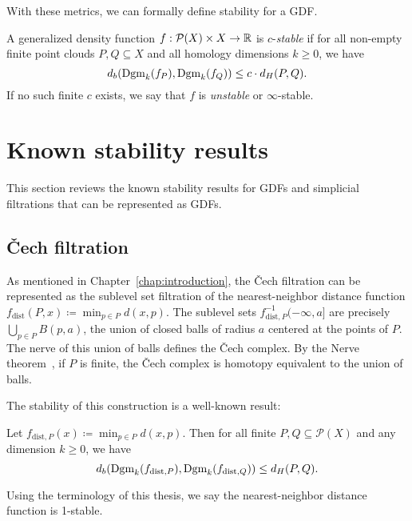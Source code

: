 With these metrics, we can formally define stability for a GDF.
\begin{definition}
    A generalized density function $f : \mathcal{P}(X) \times X \to \mathbb{R}$ is
    $c$-\emph{stable} if for all non-empty finite point clouds $P, Q \subseteq
    X$ and all homology dimensions $k \geq 0$, we have
    \begin{equation}
        d_b(\operatorname{Dgm}_k(f_P), \operatorname{Dgm}_k(f_Q)) \leq c \cdot d_H(P, Q).
    \end{equation}
    If no such finite $c$ exists, we say that $f$ is \emph{unstable} or
    $\infty$-stable.
\end{definition}

\section{Known stability results}

This section reviews the known stability results for GDFs and simplicial
filtrations that can be represented as GDFs.

\subsection{\v{C}ech filtration}
As mentioned in Chapter~\ref{chap:introduction}, the \v{C}ech filtration can be
represented as the sublevel set filtration of the nearest-neighbor distance
function $f_{\mathrm{dist}}(P, x) \coloneqq \min_{p\in P} d(x, p)$.
The sublevel sets $f_{\mathrm{dist}, P}^{-1}(-\infty, a]$ are precisely
$\bigcup_{p\in P} B(p, a)$, the union of closed balls of radius $a$ centered at
the points of $P$. The nerve of this union of balls defines the \v{C}ech
complex. By the Nerve theorem~\cite{Borsuk1948,leray1945forme}, if $P$ is finite,
the \v{C}ech complex is homotopy equivalent to the union of balls.

The stability of this construction is a well-known result:
\begin{theorem}
    Let $f_{\mathrm{dist}, P}(x) \coloneqq \min_{p\in P} d(x, p)$. Then for all finite
    $P, Q \subseteq \mathcal{P}(X)$ and any dimension $k \geq 0$, we have
    \begin{equation}
        d_b(\operatorname{Dgm}_k(f_{\mathrm{dist}, P}), \operatorname{Dgm}_k(f_{\mathrm{dist}, Q})) \leq d_H(P, Q).
    \end{equation}
\end{theorem}
Using the terminology of this thesis, we say the nearest-neighbor distance
function is 1-stable.

